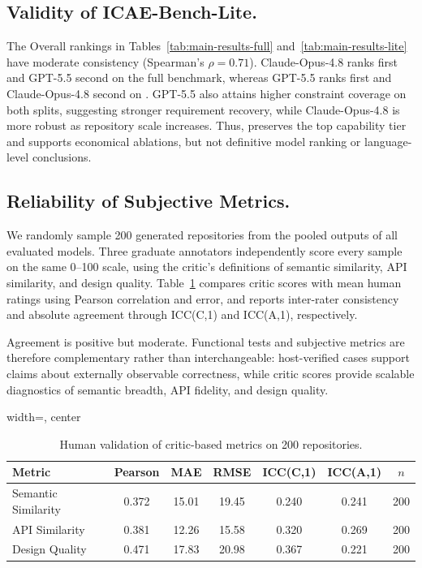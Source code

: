 \subsection{Validity of ICAE-Bench-Lite.}
The Overall rankings in Tables~\ref{tab:main-results-full} and~\ref{tab:main-results-lite} have moderate consistency (Spearman's $\rho=0.71$). Claude-Opus-4.8 ranks first and GPT-5.5 second on the full benchmark, whereas GPT-5.5 ranks first and Claude-Opus-4.8 second on \rcblite{}. GPT-5.5 also attains higher constraint coverage on both splits, suggesting stronger requirement recovery, while Claude-Opus-4.8 is more robust as repository scale increases. Thus, \rcblite{} preserves the top capability tier and supports economical ablations, but not definitive model ranking or language-level conclusions.

\subsection{Reliability of Subjective Metrics.}
We randomly sample 200 generated repositories from the pooled outputs of all evaluated models. Three graduate annotators independently score every sample on the same 0--100 scale, using the critic's definitions of semantic similarity, API similarity, and design quality. Table~\ref{tab:human-validation} compares critic scores with mean human ratings using Pearson correlation and error, and reports inter-rater consistency and absolute agreement through ICC(C,1) and ICC(A,1), respectively.

Agreement is positive but moderate. Functional tests and subjective metrics are therefore complementary rather than interchangeable: host-verified cases support claims about externally observable correctness, while critic scores provide scalable diagnostics of semantic breadth, API fidelity, and design quality.

\begin{table}[!ht]
\centering
\caption{Human validation of critic-based metrics on 200 repositories.}
\label{tab:human-validation}
\small
\begin{adjustbox}{width=\linewidth, center}
\begin{tabular}{lcccccc}
\toprule
Metric & Pearson & MAE & RMSE & ICC(C,1) & ICC(A,1) & $n$ \\
\midrule
Semantic Similarity & 0.372 & 15.01 & 19.45 & 0.240 & 0.241 & 200 \\
API Similarity & 0.381 & 12.26 & 15.58 & 0.320 & 0.269 & 200 \\
Design Quality & 0.471 & 17.83 & 20.98 & 0.367 & 0.221 & 200 \\
\bottomrule
\end{tabular}
\end{adjustbox}
\end{table}

